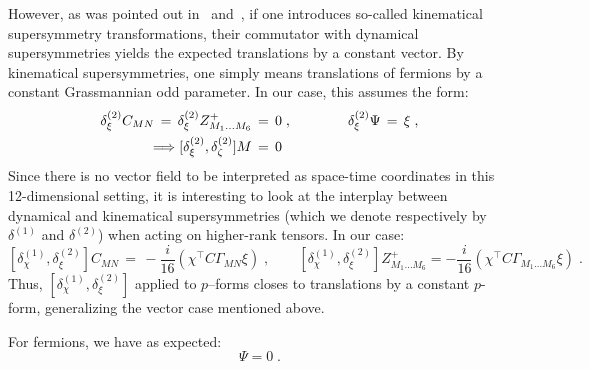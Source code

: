 \documentclass[a4paper,11pt]{article}
\begin{document}
However, as was pointed out in~\cite{IKKT} and~\cite{AIKO}, if one introduces so-called kinematical supersymmetry 
transformations, their commutator with dynamical supersymmetries yields the expected translations by a constant vector. 
By kinematical supersymmetries, one simply means translations of fermions by a constant Grassmannian odd parameter. 
In our case, this assumes the form:  
\begin{align}\label{trans}  
\delta_{\xi}^{(2)} C_{MN} \,=\, \delta_{\xi}^{(2)} Z^+_{M_1 \ldots M_6} &\,=\, 0\;, \qquad\qquad
\delta_{\xi}^{(2)} \Psi
\,= \,\xi\;,
 \\ \Longrightarrow
[\delta_{\xi}^{(2)},\delta_{\zeta}^{(2)}] M &\,=\, 0 \notag
\end{align}
Since there is no vector field to be interpreted as space-time coordinates in this 12-dimensional 
setting, it is interesting to look at the interplay between dynamical and kinematical supersymmetries 
(which we denote respectively by $\delta^{(1)}$ and $\delta^{(2)}$) when acting on higher-rank tensors.
In our case:
\begin{equation}\label{eq:trans}
[\delta_{\chi}^{(1)},\delta_{\xi}^{(2)}] C_{MN} \,=\, -\frac{i}{16} (\chi^{\top} C \Gamma_{MN} \xi)\;,\qquad
[\delta_{\chi}^{(1)},\delta_{\xi}^{(2)}] Z^+_{M_1 \ldots M_6} = -\frac{i}{16}
(\chi^{\top} C \Gamma_{M_1 \ldots M_6} \xi)\;.
\end{equation} 
Thus, $[\delta_{\chi}^{(1)},\delta_{\xi}^{(2)}]$ applied to $p$--forms closes
to translations by a constant $p$-form, generalizing the vector case mentioned
above.

For fermions, we have as expected:
\begin{equation} 
[\delta_{\chi}^{(1)},\delta_{\xi}^{(2)}] \Psi = 0\;.
\end{equation} 
\end{document}
